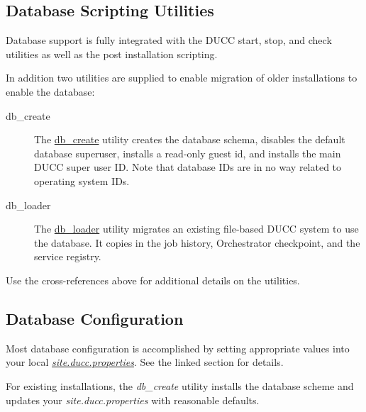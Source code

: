 \subsection{Database Scripting  Utilities}
    Database support is fully integrated with the DUCC start, stop, and check utilities as
    well as the post installation scripting.

    In addition two utilities are supplied to enable migration of older installations to
    enable the database:

    \begin{description}
      \item[db\_create] The \hyperref[subsec:cli.db.create]{db\_create} utility creates the database schema, disables the
        default database superuser, installs a read-only guest id, and installs the
        main DUCC super user ID.  Note that database IDs are in no way related to 
        operating system IDs.
      \item[db\_loader] The \hyperref[subsec:cli.db.loader]{db\_loader} utility migrates an existing file-based DUCC
        system to use the database.  It copies in the job history, Orchestrator checkpoint,
        and the service registry.
    \end{description}
      
    Use the cross-references above for additional details on the utilities.
    
\subsection{Database Configuration}
    Most database configuration is accomplished by setting appropriate values into 
    your local \hyperref[subsec:ducc.database.properties]{\em site.ducc.properties}.  See
    the linked section for details.
    
    For existing installations, the {\em db\_create} utility installs the
    database scheme and updates your {\em site.ducc.properties} with reasonable
    defaults.
